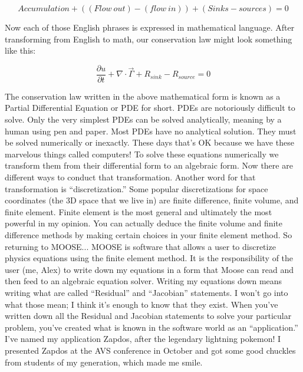 \documentclass[11pt]{article}
\begin{document}
\begin{equation}
  Accumulation + ( (Flow\ out) - (flow\ in) ) + (Sinks - sources) = 0
  \label{eq:conservation_law_English}
\end{equation}

Now each of those English phrases is expressed in mathematical language. After transforming from English to math, our conservation law might look something like this:

\begin{equation}
  \frac{\partial u}{\partial t} + \nabla\cdot\vec{\Gamma} + R_{sink} - R_{source} = 0
  \label{eq:conservation_law_math}
\end{equation}

The conservation law written in the above mathematical form is known as a Partial Differential Equation or PDE for short. PDEs are notoriously difficult to solve. Only the very simplest PDEs can be solved analytically, meaning by a human using pen and paper. Most PDEs have no analytical solution. They must be solved numerically or inexactly. These days that's OK because we have these marvelous things called computers! To solve these equations numerically we transform them from their differential form to an algebraic form. Now there are different ways to conduct that transformation. Another word for that transformation is ``discretization.'' Some popular discretizations for space coordinates (the 3D space that we live in) are finite difference, finite volume, and finite element. Finite element is the most general and ultimately the most powerful in my opinion. You can actually deduce the finite volume and finite difference methods by making certain choices in your finite element method. So returning to MOOSE... MOOSE is software that allows a user to discretize physics equations using the finite element method. It is the responsibility of the user (me, Alex) to write down my equations in a form that Moose can read and then feed to an algebraic equation solver. Writing my equations down means writing what are called ``Residual'' and ``Jacobian'' statements. I won't go into what those mean; I think it's enough to know that they exist. When you've written down all the Residual and Jacobian statements to solve your particular problem, you've created what is known in the software world as an ``application.'' I've named my application Zapdos, after the legendary lightning pokemon! I presented Zapdos at the AVS conference in October and got some good chuckles from students of my generation, which made me smile.
\end{document}
